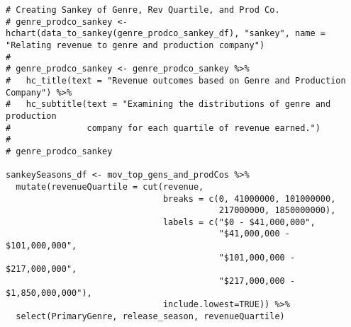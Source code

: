 \begin{lstlisting}
# Creating Sankey of Genre, Rev Quartile, and Prod Co.
# genre_prodco_sankey <- hchart(data_to_sankey(genre_prodco_sankey_df), "sankey", name = "Relating revenue to genre and production company")
# 
# genre_prodco_sankey <- genre_prodco_sankey %>%
#   hc_title(text = "Revenue outcomes based on Genre and Production Company") %>%
#   hc_subtitle(text = "Examining the distributions of genre and production 
#               company for each quartile of revenue earned.")
# 
# genre_prodco_sankey

sankeySeasons_df <- mov_top_gens_and_prodCos %>%
  mutate(revenueQuartile = cut(revenue,
                               breaks = c(0, 41000000, 101000000, 
                                          217000000, 1850000000),
                               labels = c("$0 - $41,000,000",
                                          "$41,000,000 - $101,000,000",
                                          "$101,000,000 - $217,000,000",
                                          "$217,000,000 - $1,850,000,000"),
                               include.lowest=TRUE)) %>%
  select(PrimaryGenre, release_season, revenueQuartile)
\end{lstlisting}

